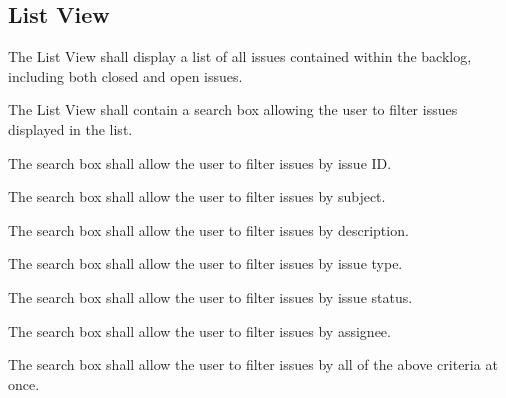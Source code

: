 \documentclass[12pt]{report}
\begin{document}
	\subsection{List View}
		\begin{reqlist}
			\item The List View shall display a list of all issues contained within the backlog, including both closed and open issues.
			\item The List View shall contain a search box allowing the user to filter issues displayed in the list.
			\begin{reqlist}
				\item The search box shall allow the user to filter issues by issue ID.
				\item The search box shall allow the user to filter issues by subject.
				\item The search box shall allow the user to filter issues by description.
				\item The search box shall allow the user to filter issues by issue type.
				\item The search box shall allow the user to filter issues by issue status.
				\item The search box shall allow the user to filter issues by assignee.
				\item The search box shall allow the user to filter issues by all of the above criteria at once.
			\end{reqlist} 
		\end{reqlist}
\end{document}
